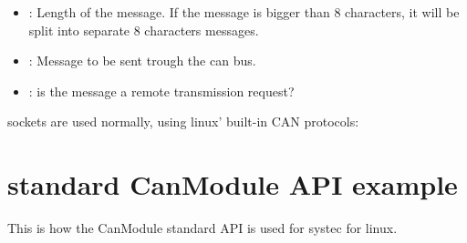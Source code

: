 \documentclass[letterpaper,10pt,english]{sphinxmanual}
\begin{document}
\begin{fulllineitems}
\begin{fulllineitems}
\begin{description}
\begin{itemize}
\item {} 
: Length of the message. If the message is bigger than 8 characters, it will be split into separate 8 characters messages. 

\item {} 
: Message to be sent trough the can bus. 

\item {} 
: is the message a remote transmission request? 

\end{itemize}

\end{description}


\end{fulllineitems}


\end{fulllineitems}


sockets are used normally, using linux’ built-in CAN protocols:

\begin{sphinxVerbatim}[commandchars=\\\{\}]
    
\end{sphinxVerbatim}


\section{standard CanModule API example}
\label{\detokenize{vendors/systec:standard-canmodule-api-example}}
This is how the CanModule standard API is used for systec for linux.

\begin{sphinxVerbatim}[commandchars=\\\{\}]
     
      
  
  
\end{sphinxVerbatim}
\end{document}
